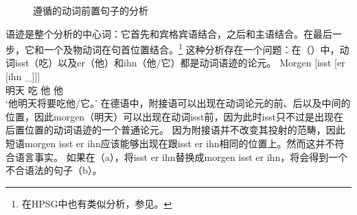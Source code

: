 \begin{figure}
\caption{\label{Abbildung-CG-isst-der-junge-den-kuchen-jacobs}遵循\citet{Jacobs91a}的动词前置句子的分析}
\end{figure}%
语迹是整个分析的中心词：它首先和宾格宾语结合，之后和主语结合。在最后一步，它和一个及物动词在句首位置结合。\footnote{在HPSG\indexhpsgc 中也有类似分析，参见。
} 
这种分析存在一个问题：在（）中，动词isst（吃）以及er（他）和ihn（他/它）都是动词语迹的论元。
\ea
\gll Morgen [isst [er [ihn \_]]]\\
     明天 \spacebr{}吃 \spacebr{}他 \spacebr{}他\\
\glt `他明天将要吃他/它。'
\z
在德语中，附接语可以出现在动词论元的前、后以及中间的位置，因此morgen（明天）可以出现在动词isst前，因为此时isst只不过是出现在后置位置的动词语迹的一个普通论元。
因为附接语并不改变其投射的范畴，因此短语morgen isst er ihn应该能够出现在跟isst er ihn相同的位置上。然而这并不符合语言事实。
如果在（a），将isst er ihn替换成morgen isst er ihn，将会得到一个不合语法的句子（b）。
\eal
{}
